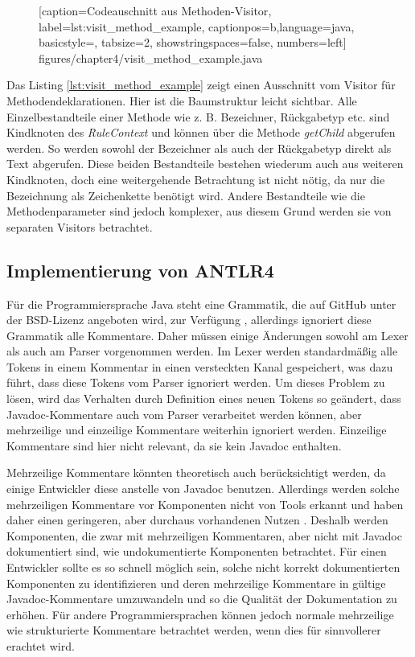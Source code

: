 		\begin{figure} [htbp]
			
			[caption={Codeauschnitt aus  Methoden-Visitor},
			label={lst:visit_method_example},
			captionpos=b,language=java, basicstyle=\footnotesize, tabsize=2, showstringspaces=false,  numbers=left]
			{figures/chapter4/visit_method_example.java}
		\end{figure}
Das Listing \ref{lst:visit_method_example} zeigt einen Ausschnitt vom Visitor für Methodendeklarationen. Hier ist die Baumstruktur leicht sichtbar. Alle Einzelbestandteile einer Methode wie z. B. Bezeichner, Rückgabetyp etc. sind Kindknoten des \textit{RuleContext} und können über die Methode \textit{getChild} abgerufen werden. So werden sowohl der Bezeichner als auch der Rückgabetyp direkt als Text abgerufen. Diese  beiden Bestandteile bestehen wiederum auch aus weiteren Kindknoten, doch eine weitergehende Betrachtung ist nicht nötig, da nur die Bezeichnung als Zeichenkette benötigt wird. Andere Bestandteile wie die Methodenparameter sind jedoch komplexer, aus diesem Grund werden sie von separaten Visitors betrachtet.

\subsection{Implementierung von ANTLR4}\label{chapter:antlr4_impl}
Für die Programmiersprache Java steht eine Grammatik, die auf GitHub unter der BSD-Lizenz angeboten wird, zur Verfügung \cite{ANTLRgrammarforjava}, allerdings ignoriert diese Grammatik alle Kommentare. Daher müssen einige Änderungen sowohl am Lexer als auch am Parser vorgenommen werden. Im Lexer werden standardmäßig alle Tokens in einem Kommentar in einen versteckten Kanal gespeichert, was dazu führt, dass diese Tokens vom Parser ignoriert werden. Um dieses Problem zu lösen, wird das Verhalten durch Definition eines neuen Tokens so geändert, dass Javadoc-Kommentare auch vom Parser verarbeitet werden können, aber mehrzeilige und einzeilige Kommentare weiterhin ignoriert werden. Einzeilige Kommentare sind hier nicht relevant, da sie kein Javadoc enthalten.

Mehrzeilige Kommentare könnten theoretisch auch berücksichtigt werden, da einige Entwickler diese anstelle von Javadoc benutzen. Allerdings werden solche mehrzeiligen Kommentare vor Komponenten nicht von Tools erkannt und haben daher einen geringeren, aber durchaus vorhandenen Nutzen \cite[S. 4]{HowDocumentationEvolvesoverTime}. Deshalb werden Komponenten, die zwar mit mehrzeiligen Kommentaren, aber nicht mit Javadoc dokumentiert sind, wie undokumentierte Komponenten betrachtet. Für einen Entwickler sollte es so schnell möglich sein, solche nicht korrekt dokumentierten Komponenten zu identifizieren und deren mehrzeilige Kommentare in gültige Javadoc-Kommentare umzuwandeln und so die Qualität der Dokumentation zu erhöhen. Für andere Programmiersprachen können jedoch normale mehrzeilige wie strukturierte Kommentare betrachtet werden, wenn dies für sinnvollerer erachtet wird.

